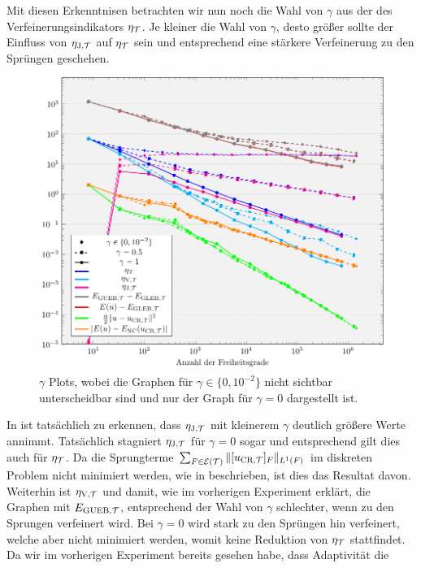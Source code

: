 Mit diesen Erkenntnisen betrachten wir nun noch die Wahl von $\gamma$
aus der  des Verfeinerungsindikators $\eta_{\mathcal{T}}$.
Je kleiner die Wahl von $\gamma$, desto größer sollte der Einfluss von
$\eta_{\textup{J}, \mathcal{T}}$ auf $\eta_{\mathcal{T}}$ sein und entsprechend eine stärkere Verfeinerung zu
den Sprüngen geschehen.
\begin{figure}[p]
  \centering
  \includegraphics[width=\linewidth]
    {pictures/chapExperiments/secExactSol/parGamma/conv.pdf}
    \caption{$\gamma$ Plots, wobei die Graphen für $\gamma \in\{0,10^{-2}\}$
    nicht sichtbar unterscheidbar sind und nur der Graph für $\gamma=0$
    dargestellt ist.}
  \label{fig:parGammaConvergence}
\end{figure}
In  ist tatsächlich zu erkennen, dass
$\eta_{\textup{J}, \mathcal{T}}$ mit kleinerem $\gamma$ deutlich größere Werte annimmt. 
Tatsächlich stagniert $\eta_{\textup{J}, \mathcal{T}}$ für $\gamma=0$ sogar und entsprechend gilt 
dies auch für $\eta_{\mathcal{T}}$.
Da die Sprungterme $\sum_{F\in\mathcal{E}(\mathcal{T})}\Vert [u_{\textup{CR}, \mathcal{T}}]_F\Vert_{L^1(F)}$ 
im diskreten Problem nicht minimiert werden, wie in
 beschrieben, ist dies das Resultat davon.
Weiterhin ist $\eta_{\textup{V}, \mathcal{T}}$ und damit, wie im vorherigen Experiment erklärt,
die Graphen mit $E_{\textup{GUEB}, \mathcal{T}}$, entsprechend der Wahl von $\gamma$ schlechter,
wenn zu den Sprungen verfeinert wird.
Bei $\gamma=0$ wird stark zu den Sprüngen hin verfeinert, welche aber nicht
minimiert werden, womit keine Reduktion von $\eta_{\mathcal{T}}$ stattfindet.
Da wir im vorherigen Experiment bereits gesehen habe, dass Adaptivität die 
